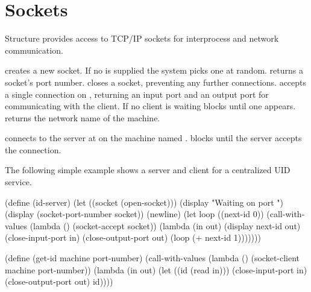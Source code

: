 \section{Sockets}

Structure  provides access to TCP/IP sockets for interprocess
 and network communication.

\begin{protos}
\end{protos}
\noindent
{} creates a new socket.
If no  is supplied the system picks one at random.
 returns a socket's port number.
 closes a socket, preventing any further connections.
 accepts a single connection on , returning
 an input port and an output port for communicating with the client.
If no client is waiting  blocks until one appears.
 returns the network name of the machine.

\begin{protos}
\end{protos}
\noindent
{} connects to the server at  on
 the machine named .
 blocks until the server accepts the connection.

The following simple example shows a server and client for a centralized UID
 service.
\begin{example}
(define (id-server)
  (let ((socket (open-socket)))
    (display "Waiting on port ")
    (display (socket-port-number socket))
    (newline)
    (let loop ((next-id 0))
      (call-with-values
        (lambda ()
          (socket-accept socket))
        (lambda (in out)
          (display next-id out)
          (close-input-port in)
          (close-output-port out)
          (loop (+ next-id 1)))))))
         
(define (get-id machine port-number)
  (call-with-values
    (lambda ()
      (socket-client machine port-number))
    (lambda (in out)
      (let ((id (read in)))
        (close-input-port in)
        (close-output-port out)
        id))))
\end{example}

